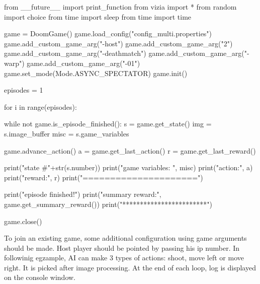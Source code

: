 \begin{pblock}
from __future__ import print_function
from vizia import *
from random import choice
from time import sleep
from time import time

game = DoomGame()
game.load_config("config_multi.properties")
game.add_custom_game_arg("-host")
game.add_custom_game_arg("2")
game.add_custom_game_arg("-deathmatch")
game.add_custom_game_arg("-warp")
game.add_custom_game_arg("-01")
game.set_mode(Mode.ASYNC_SPECTATOR)
game.init()

	
episodes = 1

for i in range(episodes):
	
	while not game.is_episode_finished():	
		s = game.get_state()
		img = s.image_buffer
		misc = s.game_variables

		game.advance_action()
		a = game.get_last_action()
		r = game.get_last_reward()
			
		print("state #"+str(s.number))
		print("game variables: ", misc)
		print("action:", a)
		print("reward:", r)
		print("=====================")
	
print("episode finished!")
print("summary reward:", game.get_summary_reward())
print("************************")

game.close()
\end{pblock}


To join an existing game, some additional configuration using game arguments should be made. Host player should be pointed by passing his ip number. In followinig egzample, AI can make 3 types of actions: shoot, move left or move right. It is picked after image processing. At the end of each loop, log is displayed on the console window.

